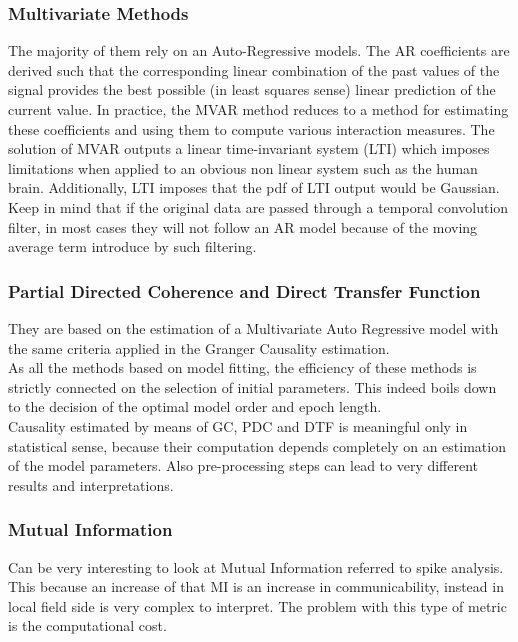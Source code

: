 \subsubsection{Multivariate Methods}
The majority of them rely on an Auto-Regressive models. The AR coefficients are derived such that the corresponding linear combination of the past values of the signal provides the best possible (in least squares sense) linear prediction of the current value. In practice, the MVAR method reduces to a method for estimating these coefficients and using them to compute various interaction measures. The solution of MVAR outputs a linear time-invariant system (LTI) which imposes limitations when applied to an obvious non linear system such as the human brain. Additionally, LTI imposes that the pdf of LTI output would be Gaussian.\\
Keep in mind that if the original data are passed through a temporal convolution filter, in most cases they will not follow an AR model because of the moving average term introduce by such filtering.
\subsubsection{Partial Directed Coherence and Direct Transfer Function}
They are based on the estimation of a Multivariate Auto Regressive model with the same criteria applied in the Granger Causality estimation.\\
As all the methods based on model fitting, the efficiency of these methods is strictly connected on the selection of initial parameters. This indeed boils down to the decision of the optimal model order and epoch length.\\
Causality estimated by means of GC, PDC and DTF is meaningful only in statistical sense, because their computation depends completely on an estimation of the model parameters. Also pre-processing steps can lead to very different results and interpretations.
\subsubsection{Mutual Information}
Can be very interesting to look at Mutual Information referred to spike analysis. This because an increase of that MI is an increase in communicability, instead in local field side is very complex to interpret. The problem with this type of metric is the computational cost.



